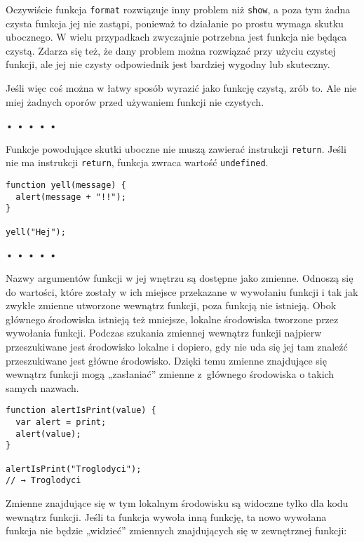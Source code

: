     
Oczywiście funkcja \texttt{format} rozwiązuje inny problem niż \texttt{show}, a poza tym żadna czysta funkcja jej nie zastąpi, ponieważ to działanie po prostu wymaga skutku ubocznego. W wielu przypadkach zwyczajnie potrzebna jest funkcja nie będąca czystą. Zdarza się też, że dany problem można rozwiązać przy użyciu czystej funkcji, ale jej nie czysty odpowiednik jest bardziej wygodny lub skuteczny.

    
Jeśli więc coś można w łatwy sposób wyrazić jako funkcję czystą, zrób to. Ale nie miej żadnych oporów przed używaniem funkcji nie czystych.

  
  
\begin{center}
• • • • •
\end{center}
  
    
Funkcje powodujące skutki uboczne nie muszą zawierać instrukcji \texttt{return}. Jeśli nie ma instrukcji \texttt{return}, funkcja zwraca wartość \texttt{undefined}.

    
\begin{verbatim} 
function yell(message) {
  alert(message + "!!");
}

yell("Hej");
 \end{verbatim}
  
  
\begin{center}
• • • • •
\end{center}
  
    
Nazwy argumentów funkcji w jej wnętrzu są dostępne jako zmienne. Odnoszą się do wartości, które zostały w ich miejsce przekazane w wywołaniu funkcji i tak jak zwykłe zmienne utworzone wewnątrz funkcji, poza funkcją nie istnieją. Obok głównego środowiska istnieją też mniejsze, lokalne środowiska tworzone przez wywołania funkcji. Podczas szukania zmiennej wewnątrz funkcji najpierw przeszukiwane jest środowisko lokalne i dopiero, gdy nie uda się jej tam znaleźć przeszukiwane jest główne środowisko. Dzięki temu zmienne znajdujące się wewnątrz funkcji mogą „zasłaniać” zmienne z~głównego środowiska o takich samych nazwach.

    
\begin{verbatim} 
function alertIsPrint(value) {
  var alert = print;
  alert(value);
}

alertIsPrint("Troglodyci");
// → Troglodyci
\end{verbatim}
    
Zmienne znajdujące się w tym lokalnym środowisku są widoczne tylko dla kodu wewnątrz funkcji. Jeśli ta funkcja wywoła inną funkcję, ta nowo wywołana funkcja nie będzie „widzieć” zmiennych znajdujących się w zewnętrznej funkcji:

